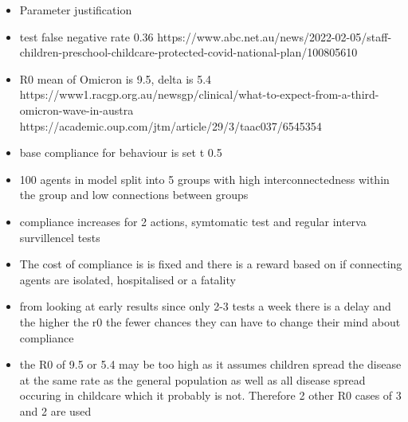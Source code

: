 \documentclass{article}
\begin{document}
\begin{itemize}

\item Parameter justification
\item test false negative rate 0.36 https://www.abc.net.au/news/2022-02-05/staff-children-preschool-childcare-protected-covid-national-plan/100805610
\item R0 mean of Omicron is 9.5, delta is 5.4  https://www1.racgp.org.au/newsgp/clinical/what-to-expect-from-a-third-omicron-wave-in-austra https://academic.oup.com/jtm/article/29/3/taac037/6545354
\item base compliance for behaviour is set t 0.5
\item 100 agents in model split into 5 groups with high interconnectedness within the group and low connections between groups

\item compliance increases for 2 actions,  symtomatic test and regular interva survillencel tests
\item The cost of compliance is is fixed and there is a reward based on if connecting agents are isolated, hospitalised or a fatality

\item from looking at early results since only 2-3 tests a week there is a delay and the higher the r0 the fewer chances they can have to change their mind about compliance 

\item the R0 of 9.5 or 5.4 may be too high as it assumes children spread the disease at the same rate as the general population as well as all disease spread occuring in childcare which it probably is not. Therefore 2 other R0 cases of 3 and 2 are used 
\end{itemize}
\end{document}
